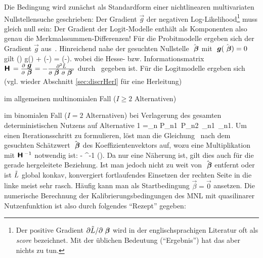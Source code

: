 Die Bedingung  wird zun\"achst als  Standardform
einer nichtlinearen multivariaten Nullstellensuche geschrieben: Der
Gradient $\vec{g}$ der negativen Log-Likelihood\footnote{Der positive
  Gradient $\partial \tilde{L}/\partial{\mbox{ \boldmath{$\beta$}}}$ wird in der englischsprachigen Literatur oft als
  \emph{score} bezeichnet. Mit der \"ublichen Bedeutung
  (``Ergebnis'') hat das aber nichts zu tun.}
 muss gleich null sein:
Der Gradient der Logit-Modelle 
enth\"alt als Komponenten also genau die Merkmalssummen-Differenzen!
F\"ur die Probitmodelle ergeben sich der Gradient $\vec{g}$
aus~. 
Hinreichend nahe der gesuchten Nullstelle $\hat{{\mbox{ \boldmath{$\beta$}}}}$ mit
${\mbox{ \boldmath{$g$}}}(\hat{{\mbox{ \boldmath{$\beta$}}}})=0$ gilt
\be
\label{TaylorMulti}
(\vec{\beta}) \approx g(\hatvecbeta)
+ \cdot (\vec{\beta}-\hatvecbeta)
= \cdot (\vec{\beta}-\hatvecbeta).
\ee
wobei die Hesse- bzw. Informationsmatrix
$\textbf{\textsf{H}}\,=\frac{\partial {\mbox{ \boldmath{$g$}}}}{\partial {\mbox{ \boldmath{$\beta$}}}}=-\frac{\partial^{2} \tilde{L}} {\partial {\mbox{ \boldmath{$\beta$}}} \ \partial {\mbox{ \boldmath{$\beta$}}}'}$
durch~ gegeben ist. F\"ur die Logitmodelle
ergeben sich (vgl. wieder 
Abschnitt \ref{sec:discrHerl} f\"ur eine Herleitung)
\bi
\item im allgemeinen multinomialen Fall ($I\ge 2$ Alternativen)
\item im binomialen Fall ($I=2$ Alternativen) bei Verlagerung des
 gesamten deterministischen Nutzens auf
Alternative 1
\be
\label{mH-BNL}
=\sum\limits_n P_{n1}\, P_{n2}\, _{n1}\, _{n1}\tr.
\ee
\ei
Um einen Iterationsschritt zu formulieren, l\"ost man
die Gleichung~ nach dem gesuchten
Sch\"atzwert $\hat{{\mbox{ \boldmath{$\beta$}}}}$ des Koeffizientenvektors auf, wozu eine
Multiplikation mit $\textbf{\textsf{H}}\,^{-1}$
notwendig ist:
\be
\label{TaylorMultii}
\hatvecbeta \approx \vec{\beta} - ^{-1} (\vec{\beta}).
\ee
Da  nur eine N\"aherung ist, gilt dies auch 
f\"ur die gerade hergeleitete
Beziehung. Ist man jedoch nicht zu weit von $\hat{{\mbox{ \boldmath{$\beta$}}}}$
entfernt oder ist $\tilde{L}$ global konkav, konvergiert fortlaufendes
Einsetzen der rechten Seite in die 
linke meist sehr rasch. H\"aufig kann man als Startbedingung
$\vec{\beta}=\vec{0}$ ansetzen. Die numerische Berechnung der
Kalibrierungsbedingungen des MNL mit
quasilinarer Nutzenfunktion ist also durch folgendes ``Rezept''
gegeben:
